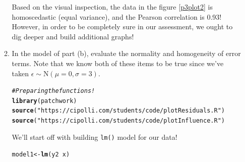 \documentclass{article}\usepackage[]{graphicx}\usepackage[]{color}
\makeatletter
\newcommand{\hlstr}[1]{\textcolor[rgb]{0.192,0.494,0.8}{#1}}%
\newcommand{\hlcom}[1]{\textcolor[rgb]{0.678,0.584,0.686}{\textit{#1}}}%
\newcommand{\hlopt}[1]{\textcolor[rgb]{0,0,0}{#1}}%
\newcommand{\hlstd}[1]{\textcolor[rgb]{0.345,0.345,0.345}{#1}}%
\newcommand{\hlkwb}[1]{\textcolor[rgb]{0.69,0.353,0.396}{#1}}%
\newcommand{\hlkwd}[1]{\textcolor[rgb]{0.737,0.353,0.396}{\textbf{#1}}}%
\newenvironment{kframe}{%
 \def\at@end@of@kframe{}%
 \ifinner\ifhmode%
  \def\at@end@of@kframe{\end{minipage}}%
  \begin{minipage}{\columnwidth}%
 \fi\fi%
 \def\FrameCommand##1{\hskip\@totalleftmargin \hskip-\fboxsep
 \colorbox{shadecolor}{##1}\hskip-\fboxsep
     \hskip-\linewidth \hskip-\@totalleftmargin \hskip\columnwidth}%
 \MakeFramed {\advance\hsize-\width
   \@totalleftmargin\z@ \linewidth\hsize
   \@setminipage}}%
 {\par\unskip\endMakeFramed%
 \at@end@of@kframe}
\newenvironment{knitrout}{}{} %
\makeatother
\begin{document}
\begin{enumerate}
\begin{enumerate}
Based on the visual inspection, the data in the figure \ref{p3plot2} is homoscedastic (equal variance), and the Pearson correlation is 0.93! However, in order to be completely sure in our assessment, we ought to dig deeper and build additional graphs!

  \item In the model of part (b), evaluate the normality and homogeneity of error terms. Note 
  that we know both of these items to be true since we've taken $\epsilon \sim 
  \textrm{N}(\mu=0,\sigma=3)$.
\begin{knitrout}
\color{fgcolor}\begin{kframe}
\begin{alltt}
\hlcom{#Preparing the functions!}
\hlkwd{library}\hlstd{(patchwork)}
\hlkwd{source}\hlstd{(}\hlstr{"https://cipolli.com/students/code/plotResiduals.R"}\hlstd{)}
\hlkwd{source}\hlstd{(}\hlstr{"https://cipolli.com/students/code/plotInfluence.R"}\hlstd{)}
\end{alltt}
\end{kframe}
\end{knitrout}

We'll start off with building \texttt{lm()} model for our data!

\begin{knitrout}
\color{fgcolor}\begin{kframe}
\begin{alltt}
\hlstd{model1} \hlkwb{<-} \hlkwd{lm}\hlstd{(y2}\hlopt{~}\hlstd{x)}
\end{alltt}
\end{kframe}
\end{knitrout}


\end{enumerate}
\end{enumerate}
\end{document}
